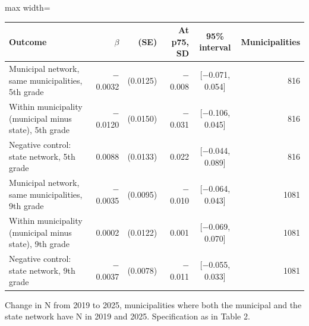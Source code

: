 \begin{adjustbox}{max width=\linewidth}
\begin{tabular}{lrrrcr}
\toprule
Outcome & $\beta$ & (SE) & At p75, SD & 95\% interval & Municipalities \\
\midrule
Municipal network, same municipalities, 5th grade & $-$0.0032 & (0.0125) & $-$0.008 & [$-$0.071, 0.054] & 816 \\
Within municipality (municipal minus state), 5th grade & $-$0.0120 & (0.0150) & $-$0.031 & [$-$0.106, 0.045] & 816 \\
Negative control: state network, 5th grade & 0.0088 & (0.0133) & 0.022 & [$-$0.044, 0.089] & 816 \\
Municipal network, same municipalities, 9th grade & $-$0.0035 & (0.0095) & $-$0.010 & [$-$0.064, 0.043] & 1081 \\
Within municipality (municipal minus state), 9th grade & 0.0002 & (0.0122) & 0.001 & [$-$0.069, 0.070] & 1081 \\
Negative control: state network, 9th grade & $-$0.0037 & (0.0078) & $-$0.011 & [$-$0.055, 0.033] & 1081 \\
\bottomrule
\end{tabular}
\end{adjustbox}
\par\smallskip\begin{minipage}{0.95\linewidth}\footnotesize Change in N from 2019 to 2025, municipalities where both the municipal and the state network have N in 2019 and 2025. Specification as in Table 2.\end{minipage}
